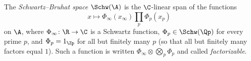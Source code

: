 The \emph{Schwartz--Bruhat space} $\Schw(\A)$ is the $\C$-linear span of the functions
\[
  x\longmapsto\Phi_\infty(x_\infty)\prod_p\Phi_p(x_p)
\]
on $\A$, where $\Phi_\infty\colon\R\to\C$ is a Schwartz function, $\Phi_p\in\Schw(\Qp)$ for every prime $p$, and
$\Phi_p=1_{\Zp}$ for all but finitely many $p$ (so that all but finitely many factors equal $1$). Such a function is
written $\Phi_\infty\otimes\bigotimes_p\Phi_p$ and called \emph{factorizable}.
